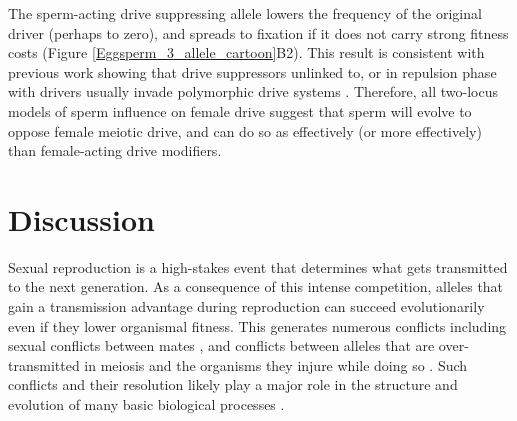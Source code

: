 \documentclass[12pt,letterpaper]{article}
\begin{document}
The sperm-acting drive suppressing allele lowers the frequency of the original driver (perhaps to zero),
	and spreads to fixation if it does not carry strong fitness costs
	(Figure \ref{Eggsperm_3_allele_cartoon}B2). 
This result is consistent with previous work showing that drive suppressors unlinked to, or in repulsion phase with drivers usually invade polymorphic drive systems \citep[e.g. ][]{Brandvain2012}.  
Therefore, all two-locus models of sperm influence on female drive suggest that
	sperm will evolve to oppose female meiotic drive, and can do so as effectively (or more effectively) than female-acting drive modifiers. 
\newline 




\section*{Discussion}

Sexual reproduction is a high-stakes event that determines what gets transmitted to the next generation.  
As a consequence of this intense competition, alleles that gain a transmission advantage during reproduction 
	can succeed evolutionarily even if they lower organismal fitness. 
This generates numerous conflicts including sexual conflicts between mates \citep{Arnqvist2005}, 
	and conflicts between alleles that are over-transmitted in
        meiosis and the organisms they injure while doing so  \citep{Burt2006}. 
Such conflicts and their resolution likely play a major role in the structure and evolution of many basic biological processes \citep{Rice2013}. \newline 
\end{document}
